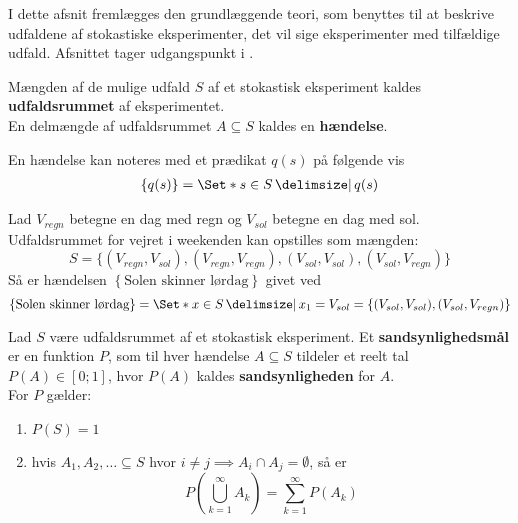 I dette afsnit fremlægges den grundlæggende teori, som benyttes til at beskrive udfaldene af stokastiske eksperimenter, det vil sige eksperimenter med tilfældige udfald. Afsnittet tager udgangspunkt i \cite{sandsynlighedsBog}.
\begin{defn}
Mængden af de mulige udfald $S$ af et stokastisk eksperiment kaldes \textbf{udfaldsrummet} af eksperimentet.\\
En delmængde af udfaldsrummet $A\subseteq S$ kaldes en \textbf{hændelse}.
\end{defn}

En hændelse kan noteres med et prædikat $q(s)$ på følgende vis
\begin{align*}
    \left\{q(s)\right\} = \Set*{s\in S\given q(s)}
\end{align*}
\begin{exmp}
Lad $V_{regn}$ betegne en dag med regn og $V_{sol}$ betegne en dag med sol. Udfaldsrummet for vejret i weekenden kan opstilles som mængden:
\begin{equation*}
    S = \{(V_{regn}, V_{sol}), (V_{regn}, V_{regn}), (V_{sol}, V_{sol}), (V_{sol}, V_{regn})\}
\end{equation*}
Så er hændelsen $\left\{\text{Solen skinner lørdag}\right\}$ givet ved
\begin{equation*}
    \left\{\text{Solen skinner lørdag}\right\} = \Set*{x \in S \given x_1 = V_{sol}} = \left\{(V_{sol}, V_{sol}), (V_{sol}, V_{regn})\right\}%
\end{equation*}
\end{exmp}

\begin{defn}  \label{def:axiomsOfPropability}
Lad $S$ være udfaldsrummet af et stokastisk eksperiment.
Et \textbf{sandsynlighedsmål} er en funktion $P$, som til hver hændelse $A \subseteq S$ tildeler et reelt tal $P(A) \in [0; 1]$, hvor $P(A)$ kaldes \textbf{sandsynligheden} for $A$. \\
For $P$ gælder:
\begin{enumerate}
    \item $P(S)=1$
    \item hvis $A_1,A_2,\ldots\subseteq S$ hvor $i \neq j \implies A_i\cap A_j=\emptyset$, så er 
    \begin{equation*}
        P\left(\bigcup_{k=1}^\infty A_k\right)=\sum_{k=1}^\infty P(A_k)
    \end{equation*} \label{enu:axiomsOfPropability2}
\end{enumerate}
\end{defn}

